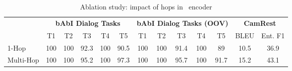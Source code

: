 \begin{table}
\centering
\footnotesize
\begin{tabular}{l|ccccc|ccccc|cc}
\toprule
   & \multicolumn{5}{c|}{\textbf{bAbI Dialog Tasks}} & \multicolumn{5}{c|}{\textbf{bAbI Dialog Tasks (OOV)}}  & \multicolumn{2}{c}{\textbf{CamRest}} \\ \cmidrule{2-6} \cmidrule{7-11} \cmidrule{12-13}
    & T1  & T2  & T3   & T4   & T5   & T1 & T2 & T3 & T4 & T5 & BLEU        & Ent. F1       \\ \midrule
1-Hop  & 100 & 100 & 92.3 & 100 & 90.5 & 100 & 100 & 91.4 & 100 & 89 & 10.5 & 36.9 \\
Multi-Hop  & 100 & 100 & 95.2 & 100  & 97.3 & 100    & 100    & 95.7   & 100    & 91.7   & 15.2        & 43.1    
\\ \bottomrule
\end{tabular}
\caption{Ablation study: impact of hops in \sys\ encoder }
\label{tab:ablationhop}
\end{table}


